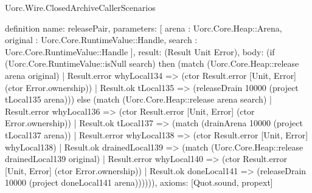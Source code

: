 \begin{lexlean}{Uorc.Wire.ClosedArchiveCallerScenarios}
\begin{semanticmodule}
definition{
  name: releasePair,
  parameters: [
    arena : Uorc.Core.Heap::Arena,
    original : Uorc.Core.RuntimeValue::Handle,
    search : Uorc.Core.RuntimeValue::Handle
  ],
  result: (Result Unit Error),
  body: (if (Uorc.Core.RuntimeValue::isNull search) then (match (Uorc.Core.Heap::release arena original)
    | Result.error whyLocal134 => (ctor Result.error [Unit, Error] (ctor Error.ownership))
    | Result.ok tLocal135 => (releaseDrain 10000 (project tLocal135 arena))) else (match (Uorc.Core.Heap::release arena search)
    | Result.error whyLocal136 => (ctor Result.error [Unit, Error] (ctor Error.ownership))
    | Result.ok tLocal137 => (match (drainArena 10000 (project tLocal137 arena))
      | Result.error whyLocal138 => (ctor Result.error [Unit, Error] whyLocal138)
      | Result.ok drainedLocal139 => (match (Uorc.Core.Heap::release drainedLocal139 original)
        | Result.error whyLocal140 => (ctor Result.error [Unit, Error] (ctor Error.ownership))
        | Result.ok doneLocal141 => (releaseDrain 10000 (project doneLocal141 arena)))))),
  axioms: [Quot.sound, propext]
}


\end{semanticmodule}
\end{lexlean}
